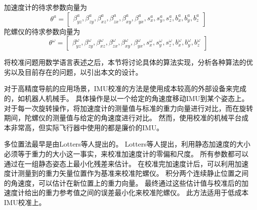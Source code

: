 \documentclass[
  type=master
]{gdutthesis}
\begin{document}
加速度计的待求参数向量为
\begin{equation}
	\theta^a = 
	\begin{bmatrix}
		\beta_{yz}^a,\beta_{zy}^a,\beta_{xz}^a,\beta_{zx}^a,\beta_{xy}^a, \beta_{yx}^a,s_x^a,s_y^a,s_z^a,b_x^a,b_y^a,b_z^a
	\end{bmatrix}
\end{equation}
陀螺仪的待求参数向量为
\begin{equation}
	\theta^\omega = 
	\begin{bmatrix}
		\beta_{yz}^\omega,\beta_{zy}^\omega,\beta_{xz}^\omega,\beta_{zx}^\omega,\beta_{xy}^\omega, \beta_{yx}^\omega,s_x^\omega,s_y^\omega,s_z^\omega,b_x^\omega,b_y^\omega,b_z^\omega
	\end{bmatrix}
\end{equation}

将校准问题用数学语言表述之后，本节将讨论具体的算法实现，分析各种算法的优劣以及目前存在的问题，以引出本文的设计。

对于高精度导航的应用场景，IMU校准的方法是使用成本较高的外部设备来完成的，如机器人机械手。
具体操作是以一个给定的角速度移动IMU到某个姿态上\cite{hall2000case}。
对于每一次旋转操作，将加速度计的测量值与标准的重力向量进行对比，而在旋转期间，陀螺仪的测量值与给定的角速度进行对比。
然而，使用校准的机械平台成本非常高，但实际飞行器中使用的都是廉价的IMU。


多位置法最早是由Lotters等人提出的\cite{lotters1998procedure}。
Lotters等人提出，利用静态加速度的大小必须等于重力的大小这一事实，来校准加速度计的零偏和尺度。
所有参数都可以通过在一组静态姿态上最小化残差来估计。
在校准完加速度计后，可以利用加速度计测量到的重力矢量位置作为基准来校准陀螺仪。
积分两个连续静止位置之间的角速度，可以估计在新位置上的重力向量。
最终通过这些估计值与校准后的加速度计给出的重力参考值之间的误差最小化来校准陀螺仪。
此方法适用于低成本IMU校准上。
\end{document}
